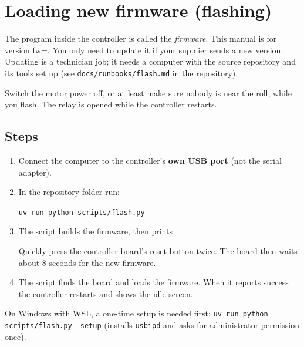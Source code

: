 \chapter{Loading new firmware (flashing)}\label{ch:flashing}

The program inside the controller is called the \emph{firmware}. This manual
is for version fw=\fwver. You only need to update it if your supplier sends a
new version. Updating is a technician job; it needs a computer with the source
repository and its tools set up (see \texttt{docs/runbooks/flash.md} in the
repository).

\begin{warning}
Switch the motor power off, or at least make sure nobody is near the roll,
while you flash. The relay is opened while the controller restarts.
\end{warning}

\section{Steps}
\begin{enumerate}
  \item Connect the computer to the controller's \textbf{own USB port} (not the
        serial adapter).
  \item In the repository folder run:\par
        \texttt{uv run python scripts/flash.py}
  \item The script builds the firmware, then prints\par
        \par
        Quickly press the controller board's reset button twice. The board
        then waits about 8 seconds for the new firmware.
  \item The script finds the board and loads the firmware. When it reports
        success the controller restarts and shows the idle screen.
\end{enumerate}

On Windows with WSL, a one-time setup is needed first:
\texttt{uv run python scripts/flash.py --setup} (installs \texttt{usbipd} and
asks for administrator permission once).

